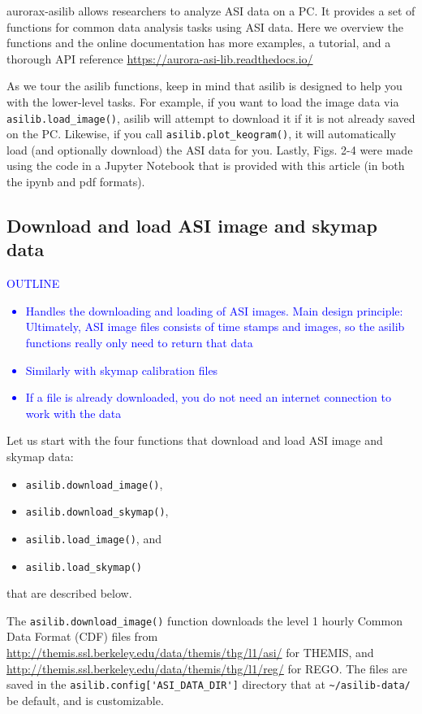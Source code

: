 \documentclass[draft]{agujournal2019}
\begin{document}
aurorax-asilib allows researchers to analyze ASI data on a PC. It provides a set of functions for common data analysis tasks using ASI data. Here we overview the functions and the online documentation has more examples, a tutorial, and a thorough API reference \url{https://aurora-asi-lib.readthedocs.io/}

As we tour the asilib functions, keep in mind that asilib is designed to help you with the lower-level tasks. For example, if you want to load the image data via \verb|asilib.load_image()|, asilib will attempt to download it if it is not already saved on the PC. Likewise, if you call \verb|asilib.plot_keogram()|, it will automatically load (and optionally download) the ASI data for you. Lastly, Figs. 2-4 were made using the code in a Jupyter Notebook that is provided with this article (in both the ipynb and pdf formats).

\subsection{Download and load ASI image and skymap data}
\textcolor{blue}{
      OUTLINE
      \begin{itemize}
            \item Handles the downloading and loading of ASI images. Main design principle: Ultimately, ASI image files consists of time stamps and images, so the asilib functions really only need to return that data
            \item Similarly with skymap calibration files
            \item If a file is already downloaded, you do not need an internet connection to work with the data
      \end{itemize}
}

Let us start with the four functions that download and load ASI image and skymap data: 

\begin{itemize}
      \item \verb|asilib.download_image()|,
      \item \verb|asilib.download_skymap()|,
      \item \verb|asilib.load_image()|, and
      \item \verb|asilib.load_skymap()|
\end{itemize} that are described below.

The \verb|asilib.download_image()| function downloads the level 1 hourly Common Data Format (CDF) files from \url{http://themis.ssl.berkeley.edu/data/themis/thg/l1/asi/} for THEMIS, and \url{http://themis.ssl.berkeley.edu/data/themis/thg/l1/reg/} for REGO. The files are saved in the \verb|asilib.config['ASI_DATA_DIR']| directory that at \verb|~/asilib-data/| be default, and is customizable.
\end{document}
